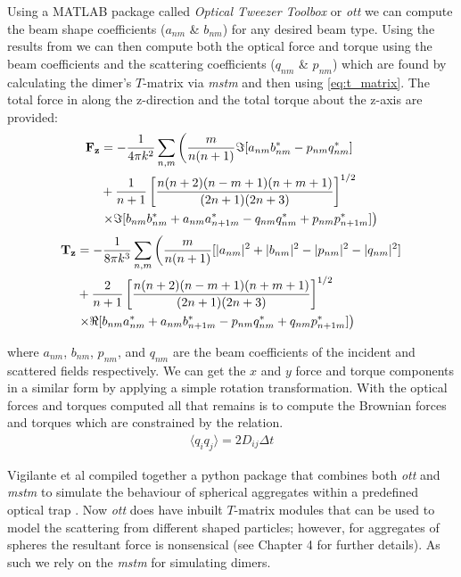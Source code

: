 Using a  MATLAB package called \textit{Optical Tweezer Toolbox} 
or \textit{ott} \cite{Nieminen2007} we can compute the beam 
shape coefficients ($a_{nm}$ \& $b_{nm}$) for any desired beam 
type. Using the results from \cite{Farsund1996} we can then 
compute both the optical force and torque using the beam 
coefficients and the scattering coefficients ($q_{nm}$ \& $p_{nm}$) 
which are found by calculating the dimer's $T$-matrix via \textit{mstm} 
\cite{Mackowski2011} and then using \eqref{eq:t_matrix}. The 
total force in along the z-direction and the total torque about 
the z-axis are provided:
\begin{equation}
	\label{eq:optical_force}
	\begin{split}
		\bold{F_z}
		&=
		-\frac{1}{4\pi k^2}\sum_{n,m} \left(\frac{m}{n(n+1)}\Im[a_{nm}b^*_{nm}-p_{nm}q^*_{nm}] \right.
		\\ 
		&+\frac{1}{n+1}\left[\frac{n(n+2)(n-m+1)(n+m+1)}{(2n+1)(2n+3)} \right]^{1/2}
		\\
		& \left.\times\Im[b_{nm}b^*_{nm}+a_{nm}a^*_{n+1m}-q_{nm}q^*_{nm}+p_{nm}p^*_{n+1m}] \right)
	\end{split}
\end{equation}
\begin{equation}
	\begin{split}
		\bold{T_z}
		&=
		-\frac{1}{8\pi k^3}\sum_{n,m} \left(\frac{m}{n(n+1)}[|a_{nm}|^2+|b_{nm}|^2-|p_{nm}|^2-|q_{nm}|^2] \right.
		\\ 
		&+\frac{2}{n+1}\left[\frac{n(n+2)(n-m+1)(n+m+1)}{(2n+1)(2n+3)} \right]^{1/2}
		\\
		& \left.\times\Re[b_{nm}a^*_{nm}+a_{nm}b^*_{n+1m}-p_{nm}q^*_{nm}+q_{nm}p^*_{n+1m}] \right)
	\end{split}
\end{equation}

where $a_{nm}$, $b_{nm}$, $p_{nm}$, and $q_{nm}$ are the beam 
coefficients of the incident and scattered fields respectively. 
We can get the $x$ and $y$ force and torque components in a 
similar form by applying a simple rotation transformation. With 
the optical forces and torques computed all that remains is to 
compute the Brownian forces and torques which are constrained 
by the relation.
\begin{align}
	\langle q_iq_j\rangle =2D_{ij}\Delta t
\end{align}

Vigilante et al compiled together a python package that combines 
both \textit{ott} and \textit{mstm} to simulate the behaviour of 
spherical aggregates within a predefined optical trap 
\cite{Vigilante2020}. Now \textit{ott} does have inbuilt $T$-matrix 
modules that can be used to model the scattering from different 
shaped particles; however, for aggregates of spheres the resultant 
force is nonsensical (see Chapter 4 for further details). As such 
we rely on the \textit{mstm} for simulating dimers.  

